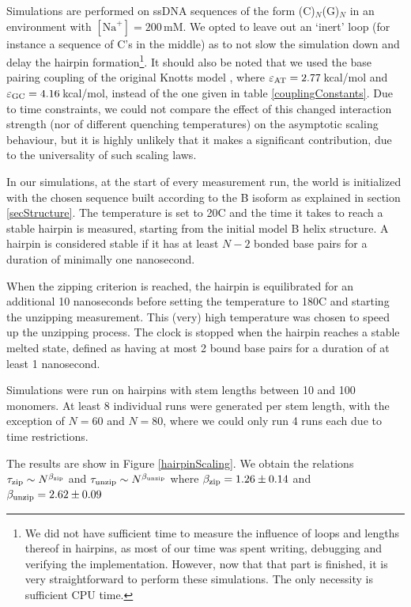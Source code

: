 Simulations are performed on ssDNA sequences of the form (C)$_N$(G)$_N$ in an environment with $[\text{Na}^+] = 200$\,mM.
We opted to leave out an `inert' loop (for instance a sequence of C's in the middle) as to not slow the simulation down and delay the hairpin formation\footnote{We did not have sufficient time to measure the influence of loops and lengths thereof in hairpins, as most of our time was spent writing, debugging and verifying the implementation.
However, now that that part is finished, it is very straightforward to perform these simulations. The only necessity is sufficient CPU time.}.
It should also be noted that we used the base pairing coupling of the original Knotts model \cite{knotts2007coarse}, where $\varepsilon_\text{AT} = 2.77$\,kcal/mol and $\varepsilon_\text{GC} = 4.16$\,kcal/mol, instead of the one given in table \ref{couplingConstants}.
Due to time constraints, we could not compare the effect of this changed interaction strength (nor of different quenching temperatures) on the asymptotic scaling behaviour, but it is highly unlikely that it makes a significant contribution, due to the universality of such scaling laws.




In our simulations, at the start of every measurement run, the world is initialized with the chosen sequence built according to the B isoform as explained in section \ref{secStructure}.
The temperature is set to 20{\degree}C and the time it takes to reach a stable hairpin is measured, starting from the initial model B helix structure.
A hairpin is considered stable if it has at least $N-2$ bonded base pairs for a duration of minimally one nanosecond.

When the zipping criterion is reached, the hairpin is equilibrated for an additional 10 nanoseconds before setting the temperature to 180{\degree}C and starting the unzipping measurement.
This (very) high temperature was chosen to speed up the unzipping process.
The clock is stopped when the hairpin reaches a stable melted state, defined as having at most 2 bound base pairs for a duration of at least 1 nanosecond.

Simulations were run on hairpins with stem lengths between 10 and 100 monomers. At least 8 individual runs were generated per stem length, with the exception of $N = 60$ and $N = 80$, where we could only run 4 runs each due to time restrictions.

The results are show in Figure \ref{hairpinScaling}. We obtain the relations ${\tau_\text{zip}} \sim N^{\beta_\text{zip}}$ and ${\tau_\text{unzip}} \sim N^{\beta_\text{unzip}}$ where ${\beta_\text{zip}} = 1.26 \pm 0.14$ and ${\beta_\text{unzip}} = 2.62 \pm 0.09$

